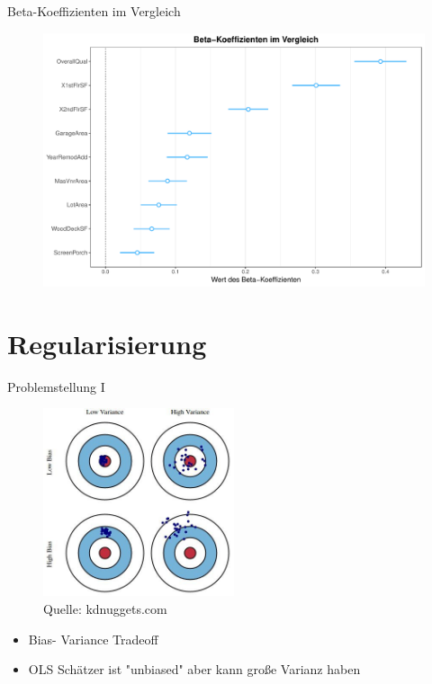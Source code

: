 \documentclass[10pt]{beamer}
\begin{document}
\begin{frame}{Beta-Koeffizienten im Vergleich}
	
	\begin{figure}
		\includegraphics[width=\textwidth, keepaspectratio]{figures/beta_koeffizienten}
	\end{figure}

\end{frame}


\section{Regularisierung}

\begin{frame}{Problemstellung I}
        \begin{figure}
            \centering
                \includegraphics[width=0.5\textwidth, keepaspectratio]{figures/bias-and-variance.jpg}
            \caption{Quelle: kdnuggets.com}
         \end{figure}
    
        \begin{itemize}
            \item Bias- Variance Tradeoff
            \item OLS Schätzer ist "unbiased" aber kann große Varianz haben
        \end{itemize}
    
\end{frame}
\end{document}
